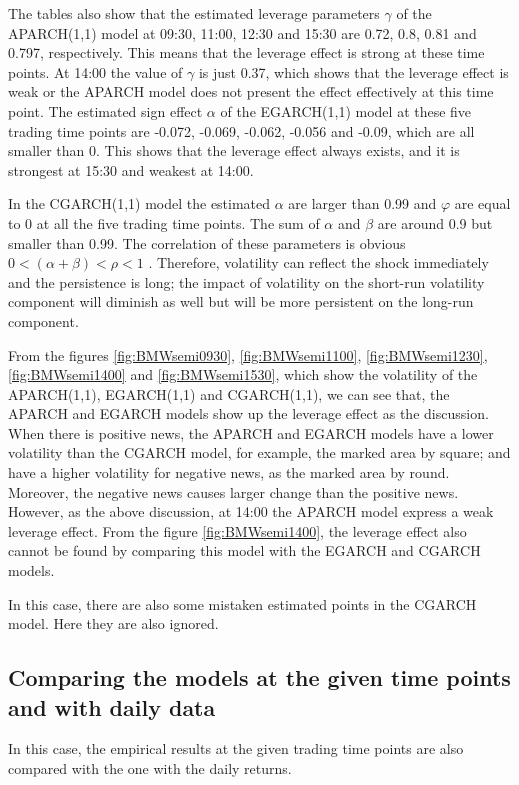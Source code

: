 The tables also show that the estimated leverage parameters $\gamma$ of the APARCH(1,1) model at 09:30, 11:00, 12:30 and 15:30 are 0.72, 0.8, 0.81 and 0.797, respectively. This means that the leverage effect is strong at these time points. At 14:00 the value of $\gamma$ is just 0.37, which shows that the leverage effect is weak or the APARCH model does not present the effect effectively at this time point. The estimated sign effect $\alpha$ of the EGARCH(1,1) model at these five trading time points are -0.072, -0.069, -0.062, -0.056 and -0.09, which are all smaller than 0. This shows that the leverage effect always exists, and it is strongest at 15:30 and weakest at 14:00.

In the CGARCH(1,1) model the estimated $\alpha$ are larger than 0.99 and $\varphi$ are equal to 0 at all the five trading time points. The sum of $\alpha$ and $\beta$ are around 0.9 but smaller than 0.99. The correlation of these parameters is obvious $0 < (\alpha + \beta) < \rho <1$ . Therefore, volatility can reflect the shock immediately and the persistence is long; the impact of volatility on the short-run volatility component will diminish as well but will be more persistent on the long-run component.

From the figures \ref{fig:BMWsemi0930}, \ref{fig:BMWsemi1100}, \ref{fig:BMWsemi1230}, \ref{fig:BMWsemi1400} and \ref{fig:BMWsemi1530}, which show the volatility of the APARCH(1,1), EGARCH(1,1) and CGARCH(1,1), we can see that, the APARCH and EGARCH models show up the leverage effect as the discussion. When there is positive news, the APARCH and EGARCH models have a lower volatility than the CGARCH model, for example, the marked area by square; and have a higher volatility for negative news, as the marked area by round. Moreover, the negative news causes larger change than the positive news. However, as the above discussion, at 14:00 the APARCH model express a weak leverage effect. From the figure \ref{fig:BMWsemi1400}, the leverage effect also cannot be found by comparing this model with the EGARCH and CGARCH models.

In this case, there are also some mistaken estimated points in the CGARCH model. Here they are also ignored.

\subsection{Comparing the models at the given time points and with daily data}

In this case, the empirical results at the given trading time points are also compared with the one with the daily returns.

